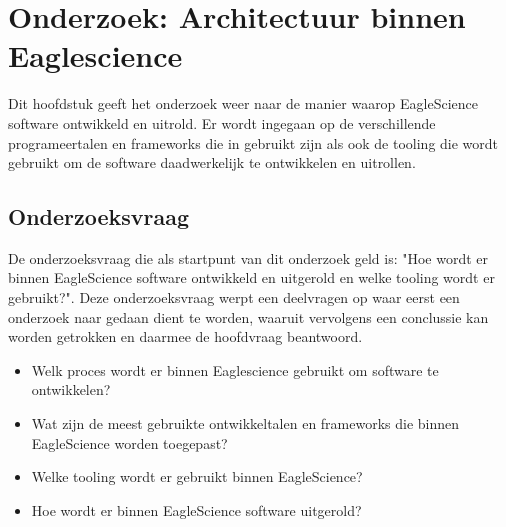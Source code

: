 \chapter{Onderzoek: Architectuur binnen Eaglescience}\label{ch:onderzoek:-architectuur-binnen-eaglescience} %


Dit hoofdstuk geeft het onderzoek weer naar de manier waarop EagleScience software ontwikkeld en uitrold. Er wordt ingegaan op de verschillende programeertalen en frameworks die in gebruikt zijn als ook de tooling die wordt gebruikt om de software daadwerkelijk te ontwikkelen en uitrollen.

\section{Onderzoeksvraag}\label{sec:ESOnderzoeksVraag}
De onderzoeksvraag die als startpunt van dit onderzoek geld is: "Hoe wordt er binnen EagleScience software ontwikkeld en uitgerold en welke tooling wordt er gebruikt?". Deze onderzoeksvraag werpt een deelvragen op waar eerst een onderzoek naar gedaan dient te worden, waaruit vervolgens een conclussie kan worden getrokken en daarmee de hoofdvraag beantwoord.
\begin{itemize}
  \item Welk proces wordt er binnen Eaglescience gebruikt om software te ontwikkelen?
  \item Wat zijn de meest gebruikte ontwikkeltalen en frameworks die binnen EagleScience worden toegepast?
  \item Welke tooling wordt er gebruikt binnen EagleScience?
  \item Hoe wordt er binnen EagleScience software uitgerold?
\end{itemize}

